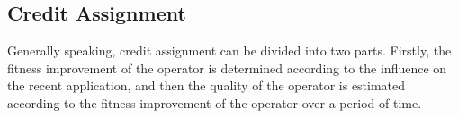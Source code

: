\documentclass[journal]{IEEEtran}
\begin{document}

\subsection{Credit Assignment \label{credit_ass}}
Generally speaking, credit assignment can be divided into two parts. Firstly, the fitness improvement of the operator is determined according to the influence on the recent application, and then the quality of the operator is estimated according to the fitness improvement of the operator over a period of time.
\end{document}

